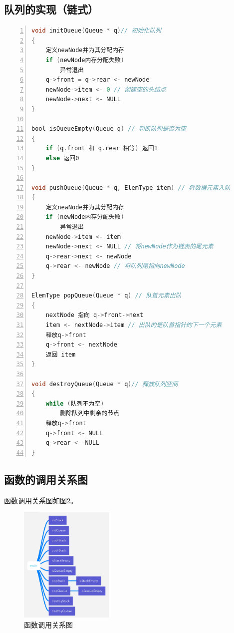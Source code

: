 \documentclass{article}
\begin{document}
\subsection{队列的实现（链式）}

\begin{lstlisting}[language={C},
    numbers=left,
    numberstyle=\tiny\consolas,
    basicstyle=\small\consolas]
void initQueue(Queue * q)// 初始化队列
{
    定义newNode并为其分配内存
    if (newNode内存分配失败)
        异常退出
    q->front = q->rear <- newNode
    newNode->item <- 0 // 创建空的头结点
    newNode->next <- NULL
}

bool isQueueEmpty(Queue q) // 判断队列是否为空
{
    if (q.front 和 q.rear 相等) 返回1
    else 返回0
}

void pushQueue(Queue * q, ElemType item) // 将数据元素入队
{
    定义newNode并为其分配内存
    if (newNode内存分配失败)
        异常退出
    newNode->item <- item
    newNode->next <- NULL // 将newNode作为链表的尾元素
    q->rear->next <- newNode
    q->rear <- newNode // 将队列尾指向newNode
}

ElemType popQueue(Queue * q) // 队首元素出队
{
    nextNode 指向 q->front->next
    item <- nextNode->item // 出队的是队首指针的下一个元素
    释放q->front
    q->front <- nextNode
    返回 item
}

void destroyQueue(Queue * q)// 释放队列空间
{
    while (队列不为空) 
        删除队列中剩余的节点
    释放q->front
    q->front <- NULL
    q->rear <- NULL
}
\end{lstlisting}

\subsection{函数的调用关系图}

函数调用关系图如图2。

\begin{figure}[htbp]
    
    \centering\includegraphics[width=0.4\textwidth]{./Images/pic2_2_3.png}
    
    \caption{函数调用关系图}
    
\end{figure}
\end{document}
